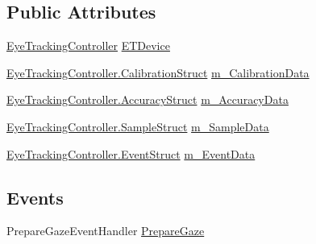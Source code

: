 \subsection*{Public Attributes}
\begin{DoxyCompactItemize}
\item 
\hyperlink{class_web_analyzer_1_1_eye_tracking_1_1_eye_tracking_controller}{Eye\+Tracking\+Controller} \hyperlink{class_web_analyzer_1_1_eye_tracking_1_1_eye_tracking_model_a8a1e9d54cc3f708adad7ea22653f6818}{E\+T\+Device}
\item 
\hyperlink{struct_web_analyzer_1_1_eye_tracking_1_1_eye_tracking_controller_1_1_calibration_struct}{Eye\+Tracking\+Controller.\+Calibration\+Struct} \hyperlink{class_web_analyzer_1_1_eye_tracking_1_1_eye_tracking_model_a5b69038b5a4c54b6b36db6d03d9a6062}{m\+\_\+\+Calibration\+Data}
\item 
\hyperlink{struct_web_analyzer_1_1_eye_tracking_1_1_eye_tracking_controller_1_1_accuracy_struct}{Eye\+Tracking\+Controller.\+Accuracy\+Struct} \hyperlink{class_web_analyzer_1_1_eye_tracking_1_1_eye_tracking_model_a52e543a36d58ae2fcc7a31873aa0cbc0}{m\+\_\+\+Accuracy\+Data}
\item 
\hyperlink{struct_web_analyzer_1_1_eye_tracking_1_1_eye_tracking_controller_1_1_sample_struct}{Eye\+Tracking\+Controller.\+Sample\+Struct} \hyperlink{class_web_analyzer_1_1_eye_tracking_1_1_eye_tracking_model_ad25c95ebc65d459b55fe943260c8c826}{m\+\_\+\+Sample\+Data}
\item 
\hyperlink{struct_web_analyzer_1_1_eye_tracking_1_1_eye_tracking_controller_1_1_event_struct}{Eye\+Tracking\+Controller.\+Event\+Struct} \hyperlink{class_web_analyzer_1_1_eye_tracking_1_1_eye_tracking_model_af9f2d9de139865bf8abbe83d0fc6e10b}{m\+\_\+\+Event\+Data}
\end{DoxyCompactItemize}
\subsection*{Events}
\begin{DoxyCompactItemize}
\item 
Prepare\+Gaze\+Event\+Handler \hyperlink{class_web_analyzer_1_1_eye_tracking_1_1_eye_tracking_model_a170dd57ad1784737ddf34dc14f82293d}{Prepare\+Gaze}
\end{DoxyCompactItemize}
